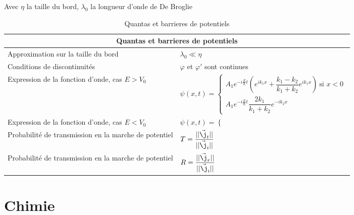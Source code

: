 \documentclass[10pt,a4paper,titlepage,landscape]{article}
\renewcommand{\arraystretch}{2}
\renewcommand{\phi}
{
    \varphi
}
\begin{document}
Avec $\eta$ la taille du bord, $\lambda_0$ la longueur d'onde de De Broglie
\begin{table}[H]
    \centering
    \renewcommand{\arraystretch}{1.5} %
    \setlength{\tabcolsep}{8pt} %
    \begin{tabular}{@{}|p{9cm}|p{10cm}@{}|}

        \multicolumn{2}{c}{\textbf{Quantas et barrieres de potentiels}} \\ \hline


        Approximation sur la taille du bord & $\lambda_0 \ll \eta$ \\ \hline
        Conditions de discontinuités & $\phi$ et $\phi'$ sont continues \\ \hline
        Expression de la fonction d'onde, cas $E > V_0$ & $\psi(x,t) = \left\{\begin{array}{l}A_1e^{-i\frac{E}{\hbar}t}\left(e^{ik_1x} + \dfrac{k_1-k_2}{k_1+k_2}e^{ik_1x}\right) \ \text{si } x < 0\\ \hline A_1 e^{-i\frac{E}{\hbar}t}\dfrac{2k_1}{k_1+k_2}e^{-ik_2x}\end{array}\right.$ \\ \hline
        Expression de la fonction d'onde, cas $E < V_0$ & $\psi(x,t) = \left\{\begin{array}{l}
        \end{array}\right.$ \\ \hline
        Probabilité de transmission en la marche de potentiel & $T = \dfrac{||\vec{\j}_t||}{||\vec{\j}_i||}$ \\ \hline
        Probabilité de transmission en la marche de potentiel & $R = \dfrac{||\vec{\j}_r||}{||\vec{\j}_i||}$ \\ \hline


\end{tabular}
\caption{Quantas et barrieres de potentiels}
\label{tab:quantpos}
\end{table}

\section{Chimie}
\end{document}
